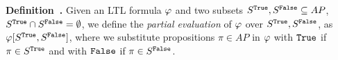 \noindent\textbf{Definition~.}
Given an LTL formula $\varphi$
and
two subsets $S^{\tt{True}}, S^{\tt{False}} \subseteq AP$, $S^{\tt{True}} \cap S^{\tt{False}} = \emptyset$,
we define
the \textit{partial evaluation} of $\varphi$ over $S^{\tt{True}}, S^{\tt{False}}$,
as $\varphi[S^{\tt{True}}, S^{\tt{False}}]$, 
where we substitute 
propositions $\pi\in AP$ in $\varphi$ with ${\tt{True}}$ if $\pi \in S^{\tt{True}}$ and with ${\tt{False}}$ if $\pi \in S^{\tt{False}}$.